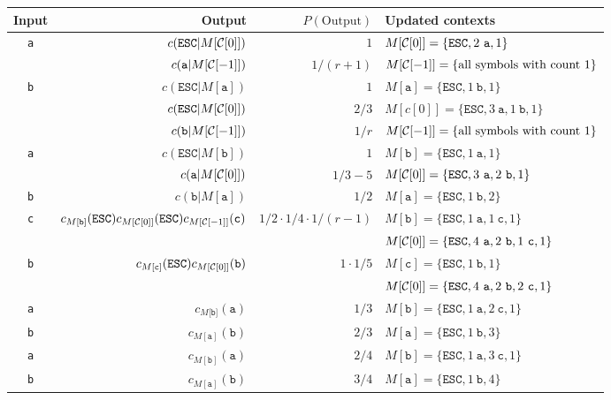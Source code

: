 \documentclass{article}
\begin{document}
\thispagestyle{empty}
\begin{tabular}{crrl}
  Input & Output & $P(\text{Output})$ & Updated contexts\\
  \hline
  {\tt a} & $c(\mathtt{ESC}|M[{\cal C}[0]])$ & $1$ & $M[{\cal C}[0]]=\{\mathtt{ESC},2~\mathtt{a},1\}$\\
  ~ & $c(\mathtt{a}|M[{\cal C}[-1]])$ & $1/(r+1)$ & $M[{\cal C}[-1]]=\{\text{all symbols with count 1}\}$\\
  {\tt b} & $c(\mathtt{ESC}|M[\texttt{a}])$ & $1$ & $M[\mathtt{a}]=\{\mathtt{ESC},1~\mathtt{b},1\}$\\
  ~ & $c(\mathtt{ESC}|M[{\cal C}[0]])$ & $2/3$ & $M[c[0]]=\{\mathtt{ESC},3~\mathtt{a},1~\mathtt{b},1\}$\\
  ~ & $c(\mathtt{b}|M[{\cal C}[-1]])$ & $1/r$ & $M[{\cal C}[-1]]=\{\text{all symbols with count 1}\}$ \\
  {\tt a} & $c(\mathtt{ESC}|M[\texttt{b}])$ & $1$ & $M[\mathtt{b}]=\{\mathtt{ESC},1~\mathtt{a},1\}$\\
 ~ & $c(\mathtt a|M[{\cal C}[0]])$ & $1/3-5$ & $M[{\cal C}[0]]=\{\mathtt{ESC},3~\mathtt{a},2~\mathtt{b},1\}$\\
    {\tt b} & $c(\mathtt b|M[\mathtt{a}])$ & $1/2$ & $M[\mathtt{a}]=\{\mathtt{ESC},1~\mathtt{b},2\}$\\
    {\tt c} & $c_{M[\mathtt{b}]}(\mathtt{ESC})c_{M[{\cal C}[0]]}(\mathtt{ESC})c_{M[{\cal C}[-1]]}(\mathtt c)$ & $1/2\cdot 1/4\cdot 1/(r-1)$ & $M[\mathtt{b}]=\{\mathtt{ESC},1~\mathtt{a},1~\mathtt{c},1\}$\\
    ~       & & & $M[{\cal C}[0]]=\{\mathtt{ESC},4~\mathtt{a},2~\mathtt{b},1~\mathtt{c},1\}$\\
    {\tt b} & $c_{M[\texttt{c}]}(\mathtt{ESC})c_{M[{\cal C}[0]]}(\mathtt b)$ & $1\cdot 1/5$ & $M[\mathtt{c}]=\{\mathtt{ESC},1~\mathtt{b},1\}$\\
    ~       & & & $M[{\cal C}[0]]=\{\mathtt{ESC},4~\mathtt{a},2~\mathtt{b},2~\mathtt{c},1\}$\\ 
    {\tt a} & $c_{M[\mathtt{b]}}(\mathtt a)$ & $1/3$ & $M[\mathtt{b}]=\{\mathtt{ESC},1~\mathtt{a},2~\mathtt{c},1\}$\\
    {\tt b} & $c_{M[\mathtt{a}]}(\mathtt b)$ & $2/3$ & $M[\mathtt{a}]=\{\mathtt{ESC},1~\mathtt{b},3\}$\\
    {\tt a} & $c_{M[\mathtt{b}]}(\mathtt a)$ & $2/4$ & $M[\mathtt{b}]=\{\mathtt{ESC},1~\mathtt{a},3~\mathtt{c},1\}$\\
    {\tt b} & $c_{M[\mathtt{a}]}(\mathtt b)$ & $3/4$ & $M[\mathtt{a}]=\{\mathtt{ESC},1~\mathtt{b},4\}$\\

\end{tabular}
\end{document}

